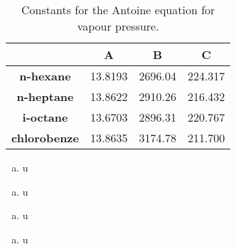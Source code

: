 \documentclass[calculator,allquestions,datasheet,solutions]{exam_newMarcus2}
\begin{document}
\begin{question}
\begin{table}[h]
\begin{center}
\begin{tabular}{||c | c c c ||} 
\hline\hline
                           & {\bf A}    &  {\bf B}    & {\bf C}    \\
\hline
{\bf n-hexane}             & 13.8193    & 2696.04     & 224.317    \\  
{\bf n-heptane}            & 13.8622    & 2910.26     & 216.432    \\  
{\bf i-octane}             & 13.6703    & 2896.31     & 220.767    \\ 
{\bf chlorobenze}           & 13.8635    & 3174.78     & 211.700    \\  
\hline\hline
\end{tabular}
\caption{Constants for the Antoine equation for vapour pressure.}
\label{Practical1:Table2}
\end{center}
\end{table}

\end{question}

\clearpage


\begin{question}
  \begin{enumerate}[a)]
    \item u
  \end{enumerate}
\end{question}

\clearpage



\begin{question}
  \begin{enumerate}[(a)]
    \item u
  \end{enumerate}
\end{question}

\clearpage


\begin{question}
  \begin{enumerate}[a)]
    \item u
  \end{enumerate}
\end{question}

\clearpage

\begin{question}
  \begin{enumerate}[a)]
    \item u
  \end{enumerate}
\end{question}


\vfill
\paperend
 


\vfill 



{
  
}
\end{document}

